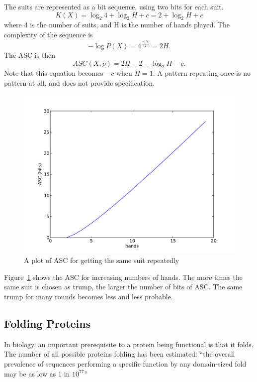 The suits are represented as a bit sequence, using two bits for each suit.
\begin{equation}
    K(X) = \log_2 4 + \log_2 H + c = 2 + \log_2 H + c
\end{equation} where 4 is the number of suits, and H is the number of hands played.
The complexity of the sequence is 
\begin{equation}
    -\log P(X) = 4^\frac{-|X|}{2} = 2H \mbox{.}
\end{equation}
The ASC is then
\begin{equation}
    ASC(X,p) = 2H - 2 - \log_2 H - c \mbox{.}
\end{equation}
Note that this equation becomes $-c$ when $H=1$.
A pattern repeating once is no pattern at all, and does not provide specification.
\begin{figure}
    \includegraphics[width=\textwidth]{EwertRepeat}
    \caption{A plot of ASC for getting the same suit repeatedly}
    \label{suit.plot}
\end{figure}
Figure~\ref{suit.plot} shows the ASC for increasing numbers of hands.
The more times the same suit is chosen as trump, the larger the number of bits of ASC.
The same trump for many rounds becomes less and less probable.

\subsection{Folding Proteins}
\label{sec_folding}

In biology, an important prerequisite to a protein being functional is that it folds.
The number of all possible proteins folding has been estimated: ``the overall prevalence of sequences performing a specific function by any domain-sized fold may be as low as 1 in $10^{77}$'' \citep{axe2004}

